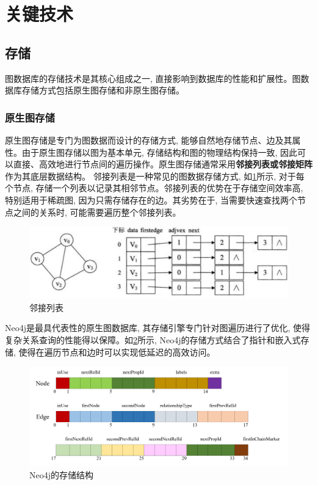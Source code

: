 \section{关键技术}

\subsection{存储}

图数据库的存储技术是其核心组成之一, 直接影响到数据库的性能和扩展性。图数据库存储方式包括原生图存储和非原生图存储。

\subsubsection{原生图存储}

原生图存储是专门为图数据而设计的存储方式, 能够自然地存储节点、边及其属性。由于原生图存储以图为基本单元, 存储结构和图的物理结构保持一致, 因此可以直接、高效地进行节点间的遍历操作。原生图存储通常采用\textbf{邻接列表或邻接矩阵}作为其底层数据结构。
邻接列表是一种常见的图数据存储方式, 如\cref{fig:adjacency-list}所示, 对于每个节点, 存储一个列表以记录其相邻节点。邻接列表的优势在于存储空间效率高, 特别适用于稀疏图, 因为只需存储存在的边。其劣势在于, 当需要快速查找两个节点之间的关系时, 可能需要遍历整个邻接列表。\begin{figure}[H]
	\centering
	\includegraphics[width=1\textwidth]{images/11.png}
	\caption{邻接列表}
	\label{fig:adjacency-list}
\end{figure}

Neo4j是最具代表性的原生图数据库, 其存储引擎专门针对图遍历进行了优化, 使得复杂关系查询的性能得以保障。如\cref{fig:neo4j}所示, Neo4j的存储方式结合了指针和嵌入式存储, 使得在遍历节点和边时可以实现低延迟的高效访问。\begin{figure}[H]
	\centering
	\includegraphics[width=1\textwidth]{images/4.png}
	\caption{Neo4j的存储结构}
	\label{fig:neo4j}
\end{figure}

